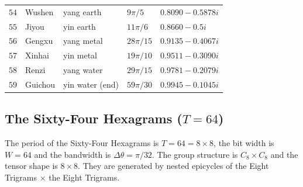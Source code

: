 \begin{longtable}{>{\centering\arraybackslash}p{0.8cm}>{\centering\arraybackslash}p{2.4cm}>{\centering\arraybackslash}p{2.2cm}>{\centering\arraybackslash}p{2cm}>{\centering\arraybackslash}p{3.5cm}}
$54$ & Wushen & yang earth & $9\pi/5$ & $0.8090-0.5878i$ \\
$55$ & Jiyou & yin earth & $11\pi/6$ & $0.8660-0.5i$ \\
$56$ & Gengxu & yang metal & $28\pi/15$ & $0.9135-0.4067i$ \\
$57$ & Xinhai & yin metal & $19\pi/10$ & $0.9511-0.3090i$ \\
$58$ & Renzi & yang water & $29\pi/15$ & $0.9781-0.2079i$ \\
$59$ & Guichou & yin water (end) & $59\pi/30$ & $0.9945-0.1045i$ \\
\end{longtable}
\endgroup

\subsection{\texorpdfstring{The Sixty-Four Hexagrams ($T=64$)}{The Sixty-Four Hexagrams (T=64)}}

\begin{definition}\label{def:liushisigua_operators}
The period of the Sixty-Four Hexagrams is $T=64=8 \times 8$, the bit width is $W=64$ and the bandwidth is $\Delta\theta=\pi/32$. The group structure is $C_8 \times C_8$ and the tensor shape is $8 \times 8$. They are generated by nested epicycles of the Eight Trigrams $\times$ the Eight Trigrams.
\end{definition}

